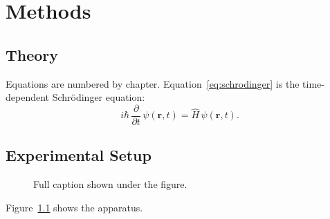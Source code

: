 \chapter{Methods}
\label{ch:methods}

\section{Theory}
Equations are numbered by chapter. Equation~\eqref{eq:schrodinger} is the
time-dependent Schr\"odinger equation:
\begin{equation}
  i\hbar\,\frac{\partial}{\partial t}\,\psi(\mathbf{r}, t) = \hat{H}\,\psi(\mathbf{r}, t).
  \label{eq:schrodinger}
\end{equation}

\section{Experimental Setup}

\begin{figure}[htbp]
  \centering
  \caption[Short caption for the list of figures]{Full caption shown under
  the figure.}
  \label{fig:setup}
\end{figure}

Figure~\ref{fig:setup} shows the apparatus.
